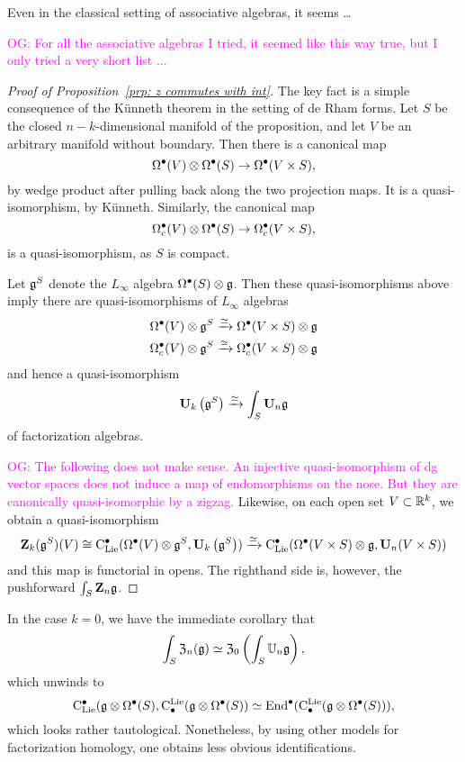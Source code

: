 \documentclass[11pt]{amsart}
\numberwithin{equation}{section}
\def\owen{\textcolor{magenta}{OG: }\textcolor{magenta}}
\begin{document}
Even in the classical setting of associative algebras, it seems \dots

\owen{For all the associative algebras I tried, it seemed like this way true, but I only tried a very short list ...}

\begin{proof}[Proof of Proposition~\ref{prp: z commutes with int}]
The key fact is a simple consequence of the K\"unneth theorem in the setting of de Rham forms.
Let $S$ be the closed $n-k$-dimensional manifold of the proposition,
and let $V$ be an arbitrary manifold without boundary.
Then there is a canonical map
\[
\Omega^\bullet(V) \otimes \Omega^\bullet(S) \to \Omega^\bullet(V \times S),
\]
by wedge product after pulling back along the two projection maps.
It is a quasi-isomorphism, by K\"unneth.
Similarly, the canonical map
\[
\Omega_c^\bullet(V) \otimes \Omega^\bullet(S) \to \Omega_c^\bullet(V \times S),
\]
is a quasi-isomorphism, as $S$ is compact.

Let $\mathfrak g^S$ denote the $L_\infty$ algebra $\Omega^\bullet(S) \otimes \mathfrak g$. 
Then these quasi-isomorphisms above imply there are quasi-isomorphisms of $L_\infty$ algebras
\begin{align*}
\Omega^\bullet(V) \otimes \mathfrak g^S &\xrightarrow{\simeq} \Omega^\bullet(V \times S) \otimes \mathfrak g \\
\Omega_c^\bullet(V) \otimes \mathfrak g^S &\xrightarrow{\simeq} \Omega_c^\bullet(V \times S) \otimes \mathfrak g 
\end{align*}
and hence a quasi-isomorphism
\[
\mathbf U_k \left(\mathfrak g^S\right) \xrightarrow{\simeq} \int_S \mathbf U_n \mathfrak g
\]
of factorization algebras.

\owen{The following does not make sense. An injective quasi-isomorphism of dg vector spaces does not induce a map of endomorphisms on the nose. But they are canonically quasi-isomorphic by a zigzag.}
Likewise, on each open set $V \subset \mathbb R^k$, 
we obtain a quasi-isomorphism
\[
\mathbf Z_k(\mathfrak g^S)(V) \cong {\rm C}_{\rm Lie}^\bullet( \Omega^\bullet(V) \otimes \mathfrak g^S, \mathbf U_k \left(\mathfrak g^S\right)) \xrightarrow{\simeq} {\rm C}_{\rm Lie}^\bullet(\Omega^\bullet(V \times S) \otimes \mathfrak g, \mathbf U_n(V \times S))
\]
and this map is functorial in opens.
The righthand side is, however, the pushforward $\int_S \mathbf Z_n \mathfrak g$.
\end{proof}

In the case $k = 0$, we have the immediate corollary that
\[
\int_{S} \mathfrak Z_n(\mathfrak g) \simeq \mathfrak Z_0 \left( \int_S \mathbb U_n \mathfrak g \right) ,
\]
which unwinds to 
\begin{equation}
\label{eqn: taut}
{\rm C}_{\rm Lie}^\bullet(\mathfrak g \otimes \Omega^\bullet(S), {\rm C}^{\rm Lie}_\bullet(\mathfrak g \otimes \Omega^\bullet(S)) \simeq {\rm End}^\bullet({\rm C}^{\rm Lie}_\bullet(\mathfrak g \otimes \Omega^\bullet(S))),
\end{equation}
which looks rather tautological.
Nonetheless, by using other models for factorization homology,
one obtains less obvious identifications.
\end{document}
